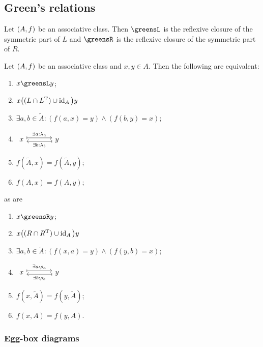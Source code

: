\subsection{Green's relations}
\begin{lemma}
Let $\left( A, f \right)$ be an associative class. Then $\greensL$ is the reflexive closure of the symmetric part of $L$ and $\greensR$ is the reflexive closure of the symmetric part of $R$.
\end{lemma}

\begin{lemma}
Let $\left( A, f \right)$ be an associative class and $x, y\in A$. Then the following are equivalent:
\begin{enumerate}
\item $x \greensL y$;
\item $x\big((L\cap L^{\mathrm{T}}) \cup \operatorname{id}_A\big)y$
\item $\exists a,b\in \widetilde{A}: (f(a, x) = y) \land (f(b, y) = x)$;
\item $\begin{tikzcd}[sep=large]
x \ar[r, maps to, shift left, "\exists a: \lambda_a"] & y \ar[l, maps to, shift left, "\exists b: \lambda_b"]
\end{tikzcd}$
\item $f(\widetilde{A},x) = f(\widetilde{A}, y)$;
\item $f(A,x) = f(A, y)$;
\end{enumerate}
as are
\begin{enumerate}
\item $x \greensR y$;
\item $x\big((R\cap R^{\mathrm{T}}) \cup \operatorname{id}_A\big)y$
\item $\exists a,b\in \widetilde{A}: (f(x, a) = y) \land (f(y, b) = x)$;
\item $\begin{tikzcd}[sep=large]
x \ar[r, maps to, shift left, "\exists a: \rho_a"] & y \ar[l, maps to, shift left, "\exists b: \rho_b"]
\end{tikzcd}$
\item $f(x, \widetilde{A}) = f(y, \widetilde{A})$;
\item $f(x, A) = f(y, A)$.
\end{enumerate}
\end{lemma}


\subsubsection{Egg-box diagrams}


